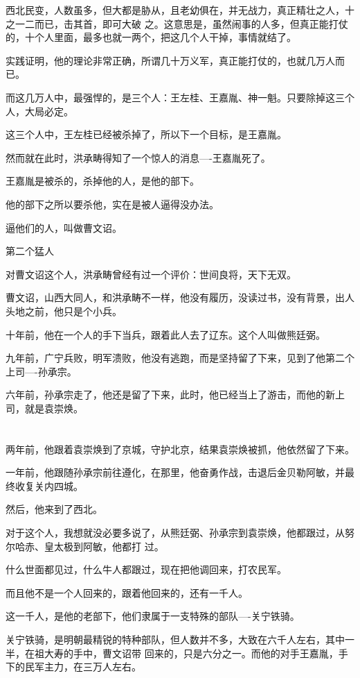 \documentclass[11pt,a4paper,onecolumn]{article}
\begin{document}
西北民变，人数虽多，但大都是胁从，且老幼俱在，并无战力，真正精壮之人，十之一二而已，击其首，即可大破
之。这意思是，虽然闹事的人多，但真正能打仗的，十个人里面，最多也就一两个，把这几个人干掉，事情就结了。

实践证明，他的理论非常正确，所谓几十万义军，真正能打仗的，也就几万人而已。

而这几万人中，最强悍的，是三个人：王左桂、王嘉胤、神一魁。只要除掉这三个人，大局必定。

这三个人中，王左桂已经被杀掉了，所以下一个目标，是王嘉胤。

然而就在此时，洪承畴得知了一个惊人的消息----王嘉胤死了。

王嘉胤是被杀的，杀掉他的人，是他的部下。

他的部下之所以要杀他，实在是被人逼得没办法。

逼他们的人，叫做曹文诏。

第二个猛人

对曹文诏这个人，洪承畴曾经有过一个评价：世间良将，天下无双。

曹文诏，山西大同人，和洪承畴不一样，他没有履历，没读过书，没有背景，出人头地之前，他只是个小兵。

十年前，他在一个人的手下当兵，跟着此人去了辽东。这个人叫做熊廷弼。

九年前，广宁兵败，明军溃败，他没有逃跑，而是坚持留了下来，见到了他第二个上司----孙承宗。

六年前，孙承宗走了，他还是留了下来，此时，他已经当上了游击，而他的新上司，就是袁崇焕。

\section[\thesection]{}

两年前，他跟着袁崇焕到了京城，守护北京，结果袁崇焕被抓，他依然留了下来。

一年前，他跟随孙承宗前往遵化，在那里，他奋勇作战，击退后金贝勒阿敏，并最终收复关内四城。

然后，他来到了西北。

对于这个人，我想就没必要多说了，从熊廷弼、孙承宗到袁崇焕，他都跟过，从努尔哈赤、皇太极到阿敏，他都打
过。

什么世面都见过，什么牛人都跟过，现在把他调回来，打农民军。

而且他不是一个人回来的，跟着他回来的，还有一千人。

这一千人，是他的老部下，他们隶属于一支特殊的部队----关宁铁骑。

关宁铁骑，是明朝最精锐的特种部队，但人数并不多，大致在六千人左右，其中一半，在祖大寿的手中，曹文诏带
回来的，只是六分之一。而他的对手王嘉胤，手下的民军主力，在三万人左右。
\end{document}
